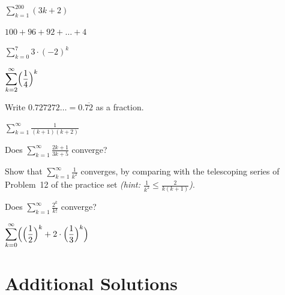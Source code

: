 \begin{problems}
  \item $\displaystyle\sum_{k=1}^{200}(3k+2)$
  \item $100+96+92+\dots+4$
  \item $\displaystyle\sum_{k=0}^{7}3\cdot(-2)^{k}$
  \item $\displaystyle\sum_{k=2}^{\infty}\Bigl(\frac14\Bigr)^{k}$
  \item Write $0.727272\ldots=0.\overline{72}$ as a fraction.
  \item $\displaystyle\sum_{k=1}^{\infty}\frac{1}{(k+1)(k+2)}$
  \item Does $\displaystyle\sum_{k=1}^{\infty}\frac{2k+1}{3k+5}$ converge?
  \item Show that $\displaystyle\sum_{k=1}^{\infty}\frac{1}{k^{2}}$
        converges, by comparing with the telescoping series of
        Problem~12 of the practice set
        \emph{(hint: $\tfrac{1}{k^{2}}\le\tfrac{2}{k(k+1)}$)}.
  \item Does $\displaystyle\sum_{k=1}^{\infty}\frac{2^{k}}{k!}$ converge?
  \item $\displaystyle\sum_{k=0}^{\infty}
        \Bigl(\Bigl(\frac12\Bigr)^{k}+2\cdot\Bigl(\frac13\Bigr)^{k}\Bigr)$
\end{problems}

\section{Additional Solutions}

